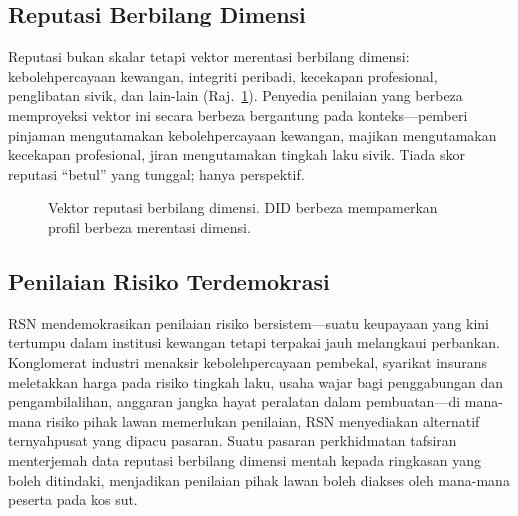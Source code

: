 \documentclass[11pt,a4paper,twocolumn]{article}
\begin{document}
\subsection{Reputasi Berbilang Dimensi}

Reputasi bukan skalar tetapi vektor merentasi berbilang dimensi: kebolehpercayaan kewangan, integriti peribadi, kecekapan profesional, penglibatan sivik, dan lain-lain (Raj.~\ref{fig:reputation-radar}). Penyedia penilaian yang berbeza memproyeksi vektor ini secara berbeza bergantung pada konteks---pemberi pinjaman mengutamakan kebolehpercayaan kewangan, majikan mengutamakan kecekapan profesional, jiran mengutamakan tingkah laku sivik. Tiada skor reputasi ``betul'' yang tunggal; hanya perspektif.

\begin{figure}[ht]
\centering
{}
\caption{Vektor reputasi berbilang dimensi. DID berbeza mempamerkan profil berbeza merentasi dimensi.}
\label{fig:reputation-radar}
\end{figure}

\subsection{Penilaian Risiko Terdemokrasi}

RSN mendemokrasikan penilaian risiko bersistem---suatu keupayaan yang kini tertumpu dalam institusi kewangan tetapi terpakai jauh melangkaui perbankan. Konglomerat industri menaksir kebolehpercayaan pembekal, syarikat insurans meletakkan harga pada risiko tingkah laku, usaha wajar bagi penggabungan dan pengambilalihan, anggaran jangka hayat peralatan dalam pembuatan---di mana-mana risiko pihak lawan memerlukan penilaian, RSN menyediakan alternatif ternyahpusat yang dipacu pasaran. Suatu pasaran perkhidmatan tafsiran menterjemah data reputasi berbilang dimensi mentah kepada ringkasan yang boleh ditindaki, menjadikan penilaian pihak lawan boleh diakses oleh mana-mana peserta pada kos sut.
\end{document}
